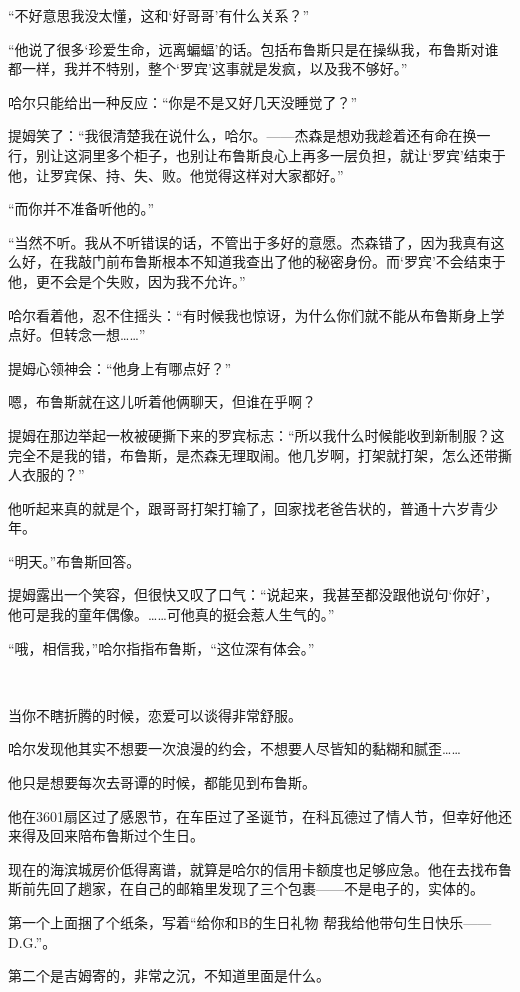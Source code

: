 \documentclass[../main]{subfiles}
\begin{document}
“不好意思我没太懂，这和‘好哥哥’有什么关系？”

“他说了很多‘珍爱生命，远离蝙蝠’的话。包括布鲁斯只是在操纵我，布鲁斯对谁都一样，我并不特别，整个‘罗宾’这事就是发疯，以及我不够好。”

哈尔只能给出一种反应：“你是不是又好几天没睡觉了？”

提姆笑了：“我很清楚我在说什么，哈尔。——杰森是想劝我趁着还有命在换一行，别让这洞里多个柜子，也别让布鲁斯良心上再多一层负担，就让‘罗宾’结束于他，让罗宾保、持、失、败。他觉得这样对大家都好。”

“而你并不准备听他的。”

“当然不听。我从不听错误的话，不管出于多好的意愿。杰森错了，因为我真有这么好，在我敲门前布鲁斯根本不知道我查出了他的秘密身份。而‘罗宾’不会结束于他，更不会是个失败，因为我不允许。”

哈尔看着他，忍不住摇头：“有时候我也惊讶，为什么你们就不能从布鲁斯身上学点好。但转念一想……”

提姆心领神会：“他身上有哪点好？”

嗯，布鲁斯就在这儿听着他俩聊天，但谁在乎啊？

提姆在那边举起一枚被硬撕下来的罗宾标志：“所以我什么时候能收到新制服？这完全不是我的错，布鲁斯，是杰森无理取闹。他几岁啊，打架就打架，怎么还带撕人衣服的？”

他听起来真的就是个，跟哥哥打架打输了，回家找老爸告状的，普通十六岁青少年。

“明天。”布鲁斯回答。

提姆露出一个笑容，但很快又叹了口气：“说起来，我甚至都没跟他说句‘你好’，他可是我的童年偶像。……可他真的挺会惹人生气的。”

“哦，相信我，”哈尔指指布鲁斯，“这位深有体会。”

~\

当你不瞎折腾的时候，恋爱可以谈得非常舒服。

哈尔发现他其实不想要一次浪漫的约会，不想要人尽皆知的黏糊和腻歪……

他只是想要每次去哥谭的时候，都能见到布鲁斯。

他在3601扇区过了感恩节，在车臣过了圣诞节，在科瓦德过了情人节，但幸好他还来得及回来陪布鲁斯过个生日。

现在的海滨城房价低得离谱，就算是哈尔的信用卡额度也足够应急。他在去找布鲁斯前先回了趟家，在自己的邮箱里发现了三个包裹——不是电子的，实体的。

第一个上面捆了个纸条，写着“给你和B的生日礼物
帮我给他带句生日快乐——D.G.”。

第二个是吉姆寄的，非常之沉，不知道里面是什么。
\end{document}
